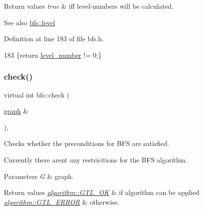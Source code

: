 \begin{DoxyRetVals}{Return values}
{\em true} & iff level-\/numbers will be calculated. \\
\hline
\end{DoxyRetVals}
\begin{DoxySeeAlso}{See also}
\mbox{\hyperlink{classbfs_ac0158a0453fb17a89be4049d21db56b1}{bfs\+::level}} 
\end{DoxySeeAlso}


Definition at line 183 of file bfs.\+h.


\begin{DoxyCode}
183 \{\textcolor{keywordflow}{return} \mbox{\hyperlink{classbfs_aab92e9d128612c28324aafe4750dbc84}{level\_number}} != 0;\}
\end{DoxyCode}
\mbox{\label{classbfs_aafdf63b57eaceb5d95f441be0f9c77bb}} 
\subsubsection{\texorpdfstring{check()}{check()}}
{\footnotesize\ttfamily virtual int bfs\+::check (\begin{DoxyParamCaption}\item[{\mbox{\hyperlink{classgraph}{graph}} \&}]{ }\end{DoxyParamCaption})\hspace{0.3cm}{\ttfamily [inline]}, {\ttfamily [virtual]}}



Checks whether the preconditions for B\+FS are satisfied. 

Currently there aren\textquotesingle{}t any restricitions for the B\+FS algorithm.


\begin{DoxyParams}{Parameters}
{\em G} & graph. \\
\hline
\end{DoxyParams}

\begin{DoxyRetVals}{Return values}
{\em \mbox{\hyperlink{classalgorithm_af1a0078e153aa99c24f9bdf0d97f6710a5114c20e4a96a76b5de9f28bf15e282b}{algorithm\+::\+G\+T\+L\+\_\+\+OK}}} & if algorithm can be applied \\
\hline
{\em \mbox{\hyperlink{classalgorithm_af1a0078e153aa99c24f9bdf0d97f6710a6fcf574690bbd6cf710837a169510dd7}{algorithm\+::\+G\+T\+L\+\_\+\+E\+R\+R\+OR}}} & otherwise. \\
\hline
\end{DoxyRetVals}


